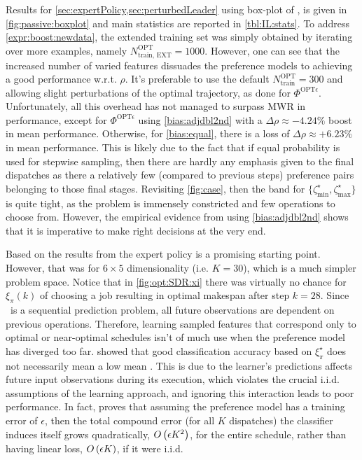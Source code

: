 \documentclass[twocolumn]{svjour3}
\begin{document}
Results for \cref{sec:expertPolicy,sec:perturbedLeader} using  
box-plot of \namerho, is given in \cref{fig:passive:boxplot} and main 
statistics are reported in \cref{tbl:IL:stats}. 
To address \ref{expr:boost:newdata}, the extended training set was simply 
obtained by iterating over more examples, namely $N^{\text{OPT}}_{\text{train, 
EXT}}=1000$. However, one can see that the increased number of varied features 
dissuades the preference models to achieving a good performance w.r.t. $\rho$. 
It's preferable to use the default $N^{\text{OPT}}_{\text{train}}=300$ and 
allowing slight perturbations of the optimal trajectory, as done for 
$\Phi^{\text{OPT}\epsilon}$. Unfortunately, all this overhead has not managed 
to surpass MWR in performance, except for $\Phi^{\text{OPT}\epsilon}$ using 
\ref{bias:adjdbl2nd} with a $\Delta\rho\approx-4.24\%$ boost in mean 
performance. Otherwise, for \ref{bias:equal}, there is a loss of 
$\Delta\rho\approx+6.23\%$ in mean performance. 
This is likely due to the fact that if equal probability is used for stepwise 
sampling, then there are hardly any emphasis given to the final dispatches as 
there a relatively few (compared to previous steps) preference pairs belonging 
to those final stages.
Revisiting \cref{fig:case}, then the band for 
$\{\zeta^{\star}_{\min},\zeta^{\star}_{\max}\}$ is quite tight, as the problem 
is immensely constricted and few operations to choose from. However, the 
empirical evidence from using \ref{bias:adjdbl2nd} shows that it is 
imperative to make right decisions at the very end.

Based on the results from \cite{InRu11a} the expert policy is a promising 
starting point.
However, that was for $6\times5$ dimensionality (i.e. $K=30$), which is a much 
simpler problem space. Notice that in \cref{fig:opt:SDR:xi} there was 
virtually no chance for $\xi_\pi(k)$ of choosing a job resulting in optimal 
makespan after step $k=28$.
Since \jsp\ is a sequential prediction problem, all future observations are 
dependent on previous operations. 
Therefore, learning sampled features that correspond only to optimal or 
near-optimal schedules isn't of much use when the preference model has 
diverged too far.  showed that good classification 
accuracy based on $\xi^\star_\pi$ does not necessarily mean a low mean \namerho.
This is due to the learner's predictions affects future input observations 
during its execution, which violates the crucial i.i.d. assumptions of the 
learning approach, and ignoring this interaction leads to poor performance.
In fact, \cite{RossB10} proves that assuming the preference model has a 
training error of $\epsilon$, then the total compound error (for all $K$ 
dispatches) the classifier induces itself grows quadratically, ${O}\left(\epsilon 
K^2\right)$, for the entire schedule, rather than having linear loss, 
${O}\left(\epsilon K\right)$, if it were i.i.d.
\end{document}
